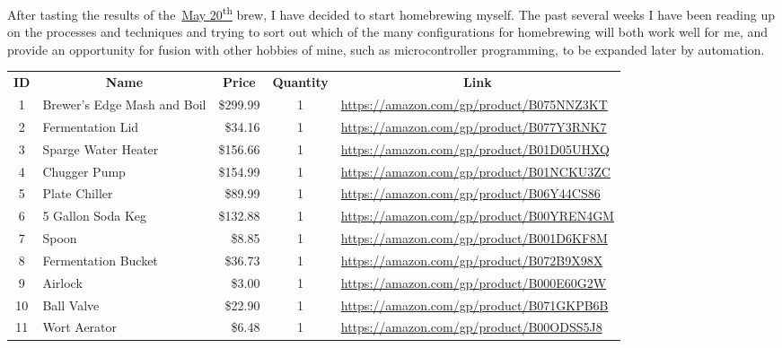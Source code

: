 
\FloatBarrier{}

After tasting the results of the~\hyperref[20180520]{May 20\textsuperscript{th}} brew, I have decided to start homebrewing myself.  The past several weeks I have been reading up on the processes and techniques and trying to sort out which of the many configurations for homebrewing will both work well for me, and provide an opportunity for fusion with other hobbies of mine, such as microcontroller programming, to be expanded later by automation.

\begin{table}[h!]
\centering
\begin{tabularx}{\textwidth}{clrcX}
    \toprule
    \multicolumn{1}{c}{\textbf{ID}} &\multicolumn{1}{c}{\textbf{Name}} & \multicolumn{1}{c}{\textbf{Price}} & \textbf{Quantity} & \multicolumn{1}{c}{\textbf{Link}} \\
    1 & Brewer's Edge Mash and Boil & \$299.99 & 1 & {\tiny\url{https://amazon.com/gp/product/B075NNZ3KT}} \\
    2 & Fermentation Lid & \$34.16 & 1 & {\tiny\url{https://amazon.com/gp/product/B077Y3RNK7}} \\
    3 & Sparge Water Heater & \$156.66 & 1 & {\tiny\url{https://amazon.com/gp/product/B01D05UHXQ}} \\
    4 & Chugger Pump & \$154.99 & 1 & {\tiny\url{https://amazon.com/gp/product/B01NCKU3ZC}} \\
    5 & Plate Chiller & \$89.99 & 1 & {\tiny\url{https://amazon.com/gp/product/B06Y44CS86}} \\
    6 & 5 Gallon Soda Keg & \$132.88 & 1 & {\tiny\url{https://amazon.com/gp/product/B00YREN4GM}} \\
    7 & Spoon & \$8.85 & 1 & {\tiny\url{https://amazon.com/gp/product/B001D6KF8M}} \\
    8 & Fermentation Bucket & \$36.73 & 1 & {\tiny\url{https://amazon.com/gp/product/B072B9X98X}} \\
    9 & Airlock & \$3.00 & 1 & {\tiny\url{https://amazon.com/gp/product/B000E60G2W}} \\
    10 & Ball Valve & \$22.90 & 1 & {\tiny\url{https://amazon.com/gp/product/B071GKPB6B}} \\
    11 & Wort Aerator & \$6.48 & 1 & {\tiny\url{https://amazon.com/gp/product/B00ODSS5J8}} \\

\end{tabularx}
\end{table}
